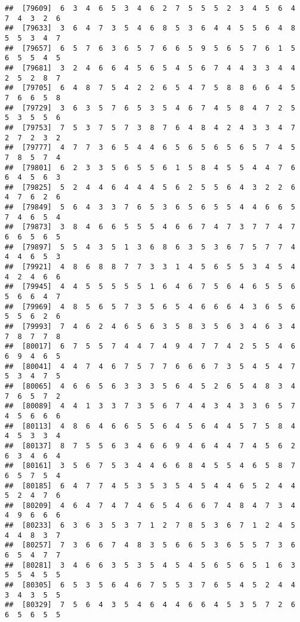 \documentclass[
]{book}
\begin{document}
\begin{verbatim}
##  [79609]  6  3  4  6  5  3  4  6  2  7  5  5  5  2  3  4  5  6  4  7  4  3  2  6
##  [79633]  3  6  4  7  3  5  4  6  8  5  3  6  4  4  5  5  6  4  8  5  5  3  4  7
##  [79657]  6  5  7  6  3  6  5  7  6  6  5  9  5  6  5  7  6  1  5  6  5  5  4  5
##  [79681]  3  2  4  6  6  4  5  6  5  4  5  6  7  4  4  3  3  4  4  2  5  2  8  7
##  [79705]  6  4  8  7  5  4  2  2  6  5  4  7  5  8  8  6  6  4  5  7  6  6  5  8
##  [79729]  3  6  3  5  7  6  5  3  5  4  6  7  4  5  8  4  7  2  5  5  3  5  5  6
##  [79753]  7  5  3  7  5  7  3  8  7  6  4  8  4  2  4  3  3  4  7  2  7  2  3  2
##  [79777]  4  7  7  3  6  5  4  4  6  5  6  5  6  5  6  5  7  4  5  7  8  5  7  4
##  [79801]  6  2  3  3  5  6  5  5  6  1  5  8  4  5  5  4  4  7  6  6  4  5  6  3
##  [79825]  5  2  4  4  6  4  4  4  5  6  2  5  5  6  4  3  2  2  6  4  7  6  2  6
##  [79849]  5  6  4  3  3  7  6  5  3  6  5  6  5  5  4  4  6  6  5  7  4  6  5  4
##  [79873]  3  8  4  6  6  5  5  5  4  6  6  7  4  7  3  7  7  4  7  6  6  5  6  5
##  [79897]  5  5  4  3  5  1  3  6  8  6  3  5  3  6  7  5  7  7  4  4  4  6  5  3
##  [79921]  4  8  6  8  8  7  7  3  3  1  4  5  6  5  5  3  4  5  4  4  2  4  6  6
##  [79945]  4  4  5  5  5  5  5  1  6  4  6  7  5  6  4  6  5  5  6  5  6  6  4  7
##  [79969]  4  8  5  6  5  7  3  5  6  5  4  6  6  6  4  3  6  5  6  5  5  6  2  6
##  [79993]  7  4  6  2  4  6  5  6  3  5  8  3  5  6  3  4  6  3  4  7  8  7  7  8
##  [80017]  6  7  5  5  7  4  4  7  4  9  4  7  7  4  2  5  5  4  6  6  9  4  6  5
##  [80041]  4  4  7  4  6  7  5  7  7  6  6  6  7  3  5  4  5  4  7  5  3  4  7  5
##  [80065]  4  6  6  5  6  3  3  3  5  6  4  5  2  6  5  4  8  3  4  7  6  5  7  2
##  [80089]  4  4  1  3  3  7  3  5  6  7  4  4  3  4  3  3  6  5  7  4  5  6  6  6
##  [80113]  4  8  6  4  6  6  5  5  6  4  5  6  4  4  5  7  5  8  4  4  5  3  3  4
##  [80137]  8  7  5  5  6  3  4  6  6  9  4  6  4  4  7  4  5  6  2  6  3  4  6  4
##  [80161]  3  5  6  7  5  3  4  4  6  6  8  4  5  5  4  6  5  8  7  6  5  7  5  4
##  [80185]  6  4  7  7  4  5  3  5  3  5  4  5  4  4  6  5  2  4  4  5  2  4  7  6
##  [80209]  4  6  4  7  4  7  4  6  5  4  6  6  7  4  8  4  7  3  4  4  9  6  6  6
##  [80233]  6  3  6  3  5  3  7  1  2  7  8  5  3  6  7  1  2  4  5  4  4  8  3  7
##  [80257]  7  3  6  6  7  4  8  3  5  6  6  5  3  6  5  5  7  3  6  6  5  4  7  7
##  [80281]  3  4  6  6  3  5  3  5  4  5  4  5  6  5  6  5  1  6  3  5  5  4  5  5
##  [80305]  6  5  3  5  6  4  6  7  5  5  3  7  6  5  4  5  2  4  4  3  4  3  5  5
##  [80329]  7  5  6  4  3  5  4  6  4  4  6  6  4  5  3  5  7  2  6  6  5  6  5  5

\end{verbatim}
\end{document}
